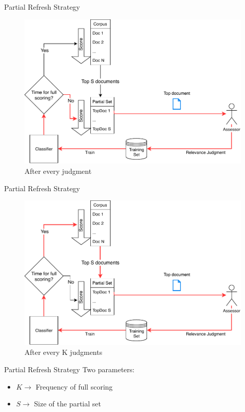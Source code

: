 \documentclass[14pt]{beamer}
\begin{document}
\begin{frame}{Partial Refresh Strategy}
\begin{figure}
 \centering 
 \includegraphics[width=1.0\textwidth]{animation/partial1.pdf}
 \caption{After every judgment}
\end{figure}
\end{frame}

\begin{frame}{Partial Refresh Strategy}
\begin{figure}
 \centering 
 \includegraphics[width=1.0\textwidth]{animation/partial2.pdf}
 \caption{After every K judgments}
\end{figure}
\end{frame}

\begin{frame}{Partial Refresh Strategy}
    Two parameters:
    \begin{itemize}
        \item $K \rightarrow$ Frequency of full scoring
        \item $S \rightarrow$ Size of the partial set
    \end{itemize}
\end{frame}
\end{document}
